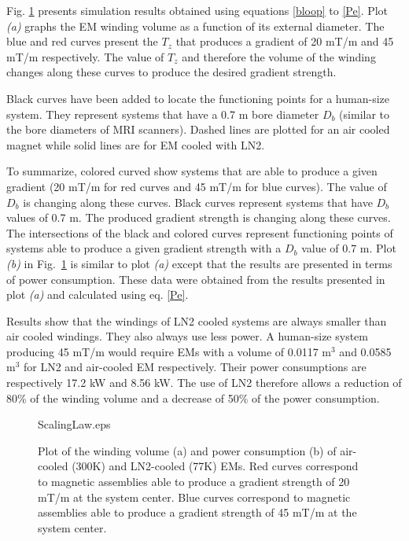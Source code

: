 Fig. \ref{fig:ScalingLaw} presents simulation results obtained using equations \ref{bloop} to \ref{Pe}. Plot \emph{(a)} graphs the EM winding volume as a function of its external diameter. The blue and red curves present the $T_z$ that produces a gradient of 20 mT/m and 45 mT/m respectively. The value of $T_z$ and therefore the volume of the winding changes along these curves to produce the desired gradient strength.

Black curves have been added to locate the functioning points for a human-size system. They represent systems that have a 0.7 m bore diameter $D_b$ (similar to the bore diameters of MRI scanners). Dashed lines are plotted for an air cooled magnet while solid lines are for EM cooled with LN2.



To summarize, colored curved show systems that are able to produce a given gradient (20 mT/m for red curves and 45 mT/m for blue curves). 
 The value of $D_b$ is changing along these curves. Black curves represent systems that have $D_b$ values of 0.7 m. 
 The produced gradient strength is changing along these curves. 
  The intersections of the black and colored curves represent functioning points of systems able to produce a given gradient strength with a $D_b$ value of 0.7 m.
Plot \emph{(b)} in Fig.~\ref{fig:ScalingLaw} is similar to plot \emph{(a)} except that the results are presented in terms of power consumption. These data were obtained from the results presented in plot \emph{(a)} and calculated using eq. \ref{Pe}.

Results show that the windings of LN2 cooled systems are always smaller than air cooled windings. They also always use less power. A human-size system producing 45 mT/m would require EMs with a volume of 0.0117 m$^3$ and 0.0585 m$^3$ for LN2 and air-cooled EM respectively. Their power consumptions are respectively 17.2 kW and 8.56 kW. The use of LN2 therefore allows a reduction of 80\% of the winding volume and a decrease of 50\% of the power consumption.




\begin{figure}
	\centering
	\begin{overpic}[width=0.45\columnwidth]{ScalingLaw.eps}
	\end{overpic}
	\caption{Plot of the winding volume (a) and power consumption (b) of air-cooled (300K) and LN2-cooled (77K) EMs. 
	Red curves correspond to magnetic assemblies able to produce a gradient strength of 20 mT/m at the system center.
	 Blue curves correspond to magnetic assemblies  able to produce a gradient strength of 45 mT/m at the system center.}
	\label{fig:ScalingLaw}
\end{figure}



